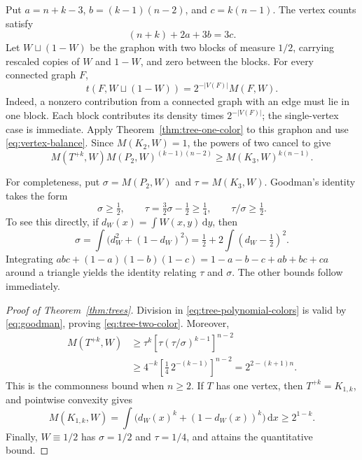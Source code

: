\documentclass[11pt,a4paper]{article}
\theoremstyle{remark}
\numberwithin{equation}{section}
\newcommand{\dd}{\,\mathrm d}
\begin{document}
Put $a=n+k-3$, $b=(k-1)(n-2)$, and $c=k(n-1)$.
The vertex counts satisfy
\begin{equation}\label{eq:vertex-balance}
 (n+k)+2a+3b=3c.
\end{equation}
Let $W\sqcup(1-W)$ be the graphon with two blocks of measure $1/2$,
carrying rescaled copies of $W$ and $1-W$, and zero between the
blocks. For every connected graph $F$,
\begin{equation}\label{eq:disjoint-colors}
 t(F,W\sqcup(1-W))=2^{-|V(F)|}M(F,W).
\end{equation}
Indeed, a nonzero contribution from a connected graph with an edge
must lie in one block. Each block contributes its density times
$2^{-|V(F)|}$; the single-vertex case is immediate.
Apply Theorem~\ref{thm:tree-one-color} to this graphon and use
\eqref{eq:vertex-balance}. Since $M(K_2,W)=1$, the powers of two
cancel to give
\begin{equation}\label{eq:tree-polynomial-colors}
 M(T^{+k},W)M(P_2,W)^{(k-1)(n-2)}
 \geq M(K_3,W)^{k(n-1)}.
\end{equation}

For completeness, put $\sigma=M(P_2,W)$ and $\tau=M(K_3,W)$.
Goodman's identity \cite{Goodman} takes the form
\begin{equation}\label{eq:goodman}
 \sigma\geq\tfrac12,\qquad
 \tau=\tfrac32\sigma-\tfrac12\geq\tfrac14,
 \qquad \tau/\sigma\geq\tfrac12.
\end{equation}
To see this directly, if $d_W(x)=\int W(x,y)\dd y$, then
\[
 \sigma=\int\bigl(d_W^2+(1-d_W)^2\bigr)
         =\tfrac12+2\int(d_W-\tfrac12)^2.
\]
Integrating
$abc+(1-a)(1-b)(1-c)=1-a-b-c+ab+bc+ca$
around a triangle yields the identity relating $\tau$ and $\sigma$.
The other bounds follow immediately.

\begin{proof}[Proof of Theorem~\ref{thm:trees}]
Division in \eqref{eq:tree-polynomial-colors} is valid by
\eqref{eq:goodman}, proving \eqref{eq:tree-two-color}. Moreover,
\begin{align*}
 M(T^{+k},W)
 &\geq\tau^k\left[\tau(\tau/\sigma)^{k-1}\right]^{n-2}\\
 &\geq 4^{-k}\left[\tfrac14\,2^{-(k-1)}\right]^{n-2}
   =2^{2-(k+1)n}.
\end{align*}
This is the commonness bound when $n\geq2$. If $T$ has one vertex,
then $T^{+k}=K_{1,k}$, and pointwise convexity gives
\[
 M(K_{1,k},W)=\int\bigl(d_W(x)^k+(1-d_W(x))^k\bigr)\dd x
             \geq2^{1-k}.
\]
Finally, $W\equiv1/2$ has $\sigma=1/2$ and $\tau=1/4$, and
attains the quantitative bound.
\end{proof}
\end{document}
